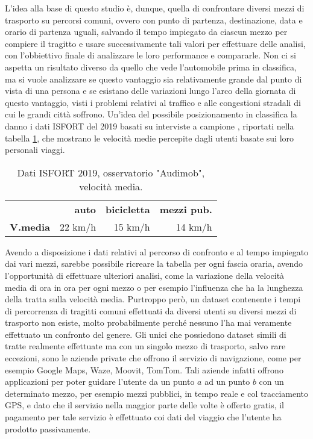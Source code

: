 L'idea alla base di questo studio è, dunque, quella di confrontare diversi mezzi di trasporto su percorsi comuni, ovvero con punto di partenza, destinazione, data e orario di partenza uguali, salvando il tempo impiegato da ciascun mezzo per compiere il tragitto e usare successivamente tali valori per effettuare delle analisi, con l'obbiettivo finale di analizzare le loro performance e compararle. Non ci si aspetta un risultato diverso da quello che vede l'automobile prima in classifica, ma si vuole analizzare se questo vantaggio sia relativamente grande dal punto di vista di una persona e se esistano delle variazioni lungo l'arco della giornata di questo vantaggio, visti i problemi relativi al traffico e alle congestioni stradali di cui le grandi città soffrono. Un'idea del possibile posizionamento in classifica la danno i dati ISFORT del 2019 basati su interviste a campione \cite{isfortaudimob}, riportati nella tabella \ref{table:9}, che mostrano le velocità medie percepite dagli utenti basate sui loro personali viaggi.

\begin{table}[H]
	\centering
	\begin{tabular}{ | l  r  r r | }
		\hline
		& \textbf{auto} & \textbf{bicicletta} & \textbf{mezzi pub.} \\
		\textbf{V.media} & 22 km/h & 15 km/h & 14 km/h \\
		\hline
	\end{tabular}
	\caption{Dati ISFORT 2019, osservatorio "Audimob", velocità media.}
	\label{table:9}
\end{table}

Avendo a disposizione i dati relativi al percorso di confronto e al tempo impiegato dai vari mezzi, sarebbe possibile ricreare la tabella per ogni fascia oraria, avendo l'opportunità di effettuare ulteriori analisi, come la variazione della velocità media di ora in ora per ogni mezzo o per esempio l'influenza che ha la lunghezza della tratta sulla velocità media. Purtroppo però, un dataset contenente i tempi di percorrenza di tragitti comuni effettuati da diversi utenti su diversi mezzi di trasporto non esiste, molto probabilmente perché nessuno l'ha mai veramente effettuato un confronto del genere. Gli unici che possiedono dataset simili di tratte realmente effettuate ma con un singolo mezzo di trasporto, salvo rare eccezioni, sono le aziende private che offrono il servizio di navigazione, come per esempio Google Maps, Waze, Moovit, TomTom. Tali aziende infatti offrono applicazioni per poter guidare l'utente da un punto $a$ ad un punto $b$ con un determinato mezzo, per esempio mezzi pubblici, in tempo reale e col tracciamento GPS, e dato che il servizio nella maggior parte delle volte è offerto gratis, il pagamento per tale servizio è effettuato coi dati del viaggio che l'utente ha prodotto passivamente.

